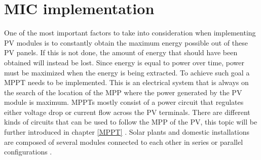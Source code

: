 
\section{MIC implementation}

One of the most important factors to take into consideration when implementing PV modules is to constantly obtain the maximum energy possible out of these PV panels. If this is not done, the amount of energy that should have been obtained will instead be lost. Since energy is equal to power over time, power must be maximized when the energy is being extracted. To achieve such goal a MPPT needs to be implemented. This is an electrical system that is always on the search of the location of the MPP where the power generated by the PV module is maximum. MPPTs mostly consist of a power circuit that regulates either voltage drop or current flow across the PV terminals. There are different kinds of circuits that can be used to follow the MPP of the PV, this topic will be further introduced in chapter \ref{MPPT} .
Solar plants and domestic installations are composed of several modules connected to each other in series or parallel configurations .

